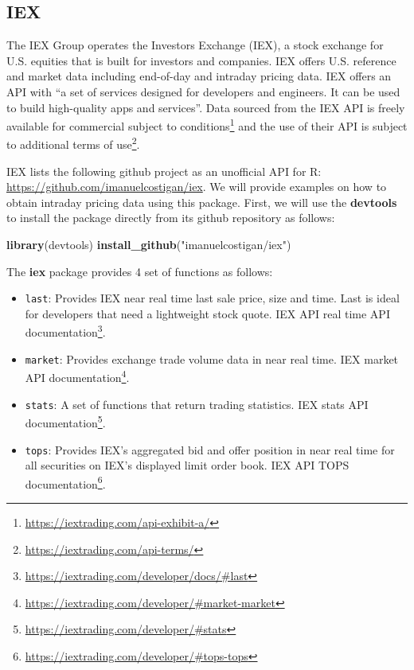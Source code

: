 \documentclass[]{book}
\newenvironment{Shaded}{\begin{snugshade}}{\end{snugshade}}
\newcommand{\KeywordTok}[1]{\textcolor[rgb]{0.13,0.29,0.53}{\textbf{#1}}}
\newcommand{\StringTok}[1]{\textcolor[rgb]{0.31,0.60,0.02}{#1}}
\newcommand{\NormalTok}[1]{#1}
\DeclareRobustCommand{\href}[2]{#2\footnote{\url{#1}}}
\providecommand{\tightlist}{%
  \setlength{\itemsep}{0pt}\setlength{\parskip}{0pt}}
\theoremstyle{definition}
\theoremstyle{definition}
\theoremstyle{definition}
\theoremstyle{remark}
\begin{document}
\subsection{IEX}\label{iex}

The IEX Group operates the Investors Exchange (IEX), a stock exchange
for U.S. equities that is built for investors and companies. IEX offers
U.S. reference and market data including end-of-day and intraday pricing
data. IEX offers an API with ``a set of services designed for developers
and engineers. It can be used to build high-quality apps and services''.
Data sourced from the IEX API is freely available for commercial subject
to \href{https://iextrading.com/api-exhibit-a/}{conditions} and the use
of their API is subject to additional
\href{https://iextrading.com/api-terms/}{terms of use}.

IEX lists the following github project as an unofficial API for R:
\url{https://github.com/imanuelcostigan/iex}. We will provide examples
on how to obtain intraday pricing data using this package. First, we
will use the \textbf{devtools} to install the package directly from its
github repository as follows:

\begin{Shaded}
\begin{Highlighting}[]
\KeywordTok{library}\NormalTok{(devtools)}
\KeywordTok{install_github}\NormalTok{(}\StringTok{"imanuelcostigan/iex"}\NormalTok{)}
\end{Highlighting}
\end{Shaded}

The \textbf{iex} package provides 4 set of functions as follows:

\begin{itemize}
\tightlist
\item
  \texttt{last}: Provides IEX near real time last sale price, size and
  time. Last is ideal for developers that need a lightweight stock
  quote. \href{https://iextrading.com/developer/docs/\#last}{IEX API
  real time API documentation}.
\item
  \texttt{market}: Provides exchange trade volume data in near real
  time. \href{https://iextrading.com/developer/\#market-market}{IEX
  market API documentation}.
\item
  \texttt{stats}: A set of functions that return trading statistics.
  \href{https://iextrading.com/developer/\#stats}{IEX stats API
  documentation}.
\item
  \texttt{tops}: Provides IEX's aggregated bid and offer position in
  near real time for all securities on IEX's displayed limit order book.
  \href{https://iextrading.com/developer/\#tops-tops}{IEX API TOPS
  documentation}.
\end{itemize}
\end{document}
